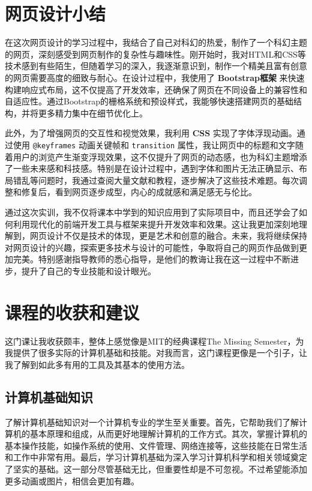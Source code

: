 \documentclass[supercite]{Experimental_Report}
\theoremstyle{definition}
\begin{document}
\section{网页设计小结}

在这次网页设计的学习过程中，我结合了自己对科幻的热爱，制作了一个科幻主题的网页，深刻感受到网页制作的复杂性与趣味性。刚开始时，我对HTML和CSS等技术感到有些陌生，但随着学习的深入，我逐渐意识到，制作一个精美且富有创意的网页需要高度的细致与耐心。在设计过程中，我使用了 \textbf{Bootstrap框架} 来快速构建响应式布局，这不仅提高了开发效率，还确保了网页在不同设备上的兼容性和自适应性。通过Bootstrap的栅格系统和预设样式，我能够快速搭建网页的基础结构，并将更多精力集中在细节优化上。

此外，为了增强网页的交互性和视觉效果，我利用 \textbf{CSS} 实现了字体浮现动画。通过使用 \texttt{@keyframes} 动画关键帧和 \texttt{transition} 属性，我让网页中的标题和文字随着用户的浏览产生渐变浮现效果，这不仅提升了网页的动态感，也为科幻主题增添了一些未来感和科技感。特别是在设计过程中，遇到字体和图片无法正确显示、布局错乱等问题时，我通过查阅大量文献和教程，逐步解决了这些技术难题。每次调整和修复后，看到网页逐步成型，内心的成就感和满足感无与伦比。

通过这次实训，我不仅将课本中学到的知识应用到了实际项目中，而且还学会了如何利用现代化的前端开发工具与框架来提升开发效率和效果。这让我更加深刻地理解到，网页设计不仅是技术的体现，更是艺术和创意的融合。未来，我将继续保持对网页设计的兴趣，探索更多技术与设计的可能性，争取将自己的网页作品做到更加完美。特别感谢指导教师的悉心指导，是他们的教诲让我在这一过程中不断进步，提升了自己的专业技能和设计眼光。


\newpage

\section{课程的收获和建议}

这门课让我收获颇丰，整体上感觉像是MIT的经典课程The Missing Semester，为我提供了很多实际的计算机基础和技能。对我而言，这门课程更像是一个引子，让我了解到如此多有用的工具及其基本的使用方法。

\subsection{计算机基础知识}

了解计算机基础知识对一个计算机专业的学生至关重要。首先，它帮助我们了解计算机的基本原理和组成，从而更好地理解计算机的工作方式。其次，掌握计算机的基本操作技能，如操作系统的使用、文件管理、网络连接等，这些技能在日常生活和工作中非常有用。最后，学习计算机基础为深入学习计算机科学和相关领域奠定了坚实的基础。这一部分尽管基础无比，但重要性却是不可忽视。不过希望能添加更多动画或图片，相信会更加有趣。
\end{document}
